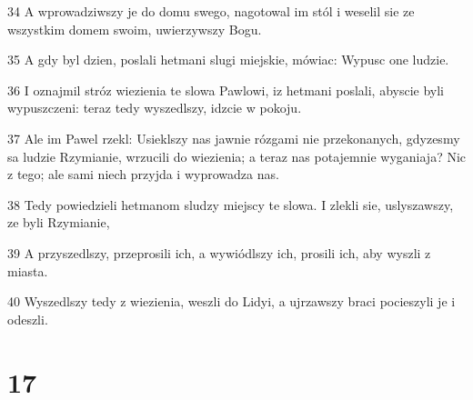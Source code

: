 \par 34 A wprowadziwszy je do domu swego, nagotowal im stól i weselil sie ze wszystkim domem swoim, uwierzywszy Bogu.
\par 35 A gdy byl dzien, poslali hetmani slugi miejskie, mówiac: Wypusc one ludzie.
\par 36 I oznajmil stróz wiezienia te slowa Pawlowi, iz hetmani poslali, abyscie byli wypuszczeni: teraz tedy wyszedlszy, idzcie w pokoju.
\par 37 Ale im Pawel rzekl: Usieklszy nas jawnie rózgami nie przekonanych, gdyzesmy sa ludzie Rzymianie, wrzucili do wiezienia; a teraz nas potajemnie wyganiaja? Nic z tego; ale sami niech przyjda i wyprowadza nas.
\par 38 Tedy powiedzieli hetmanom sludzy miejscy te slowa. I zlekli sie, uslyszawszy, ze byli Rzymianie,
\par 39 A przyszedlszy, przeprosili ich, a wywiódlszy ich, prosili ich, aby wyszli z miasta.
\par 40 Wyszedlszy tedy z wiezienia, weszli do Lidyi, a ujrzawszy braci pocieszyli je i odeszli.

\chapter{17}

